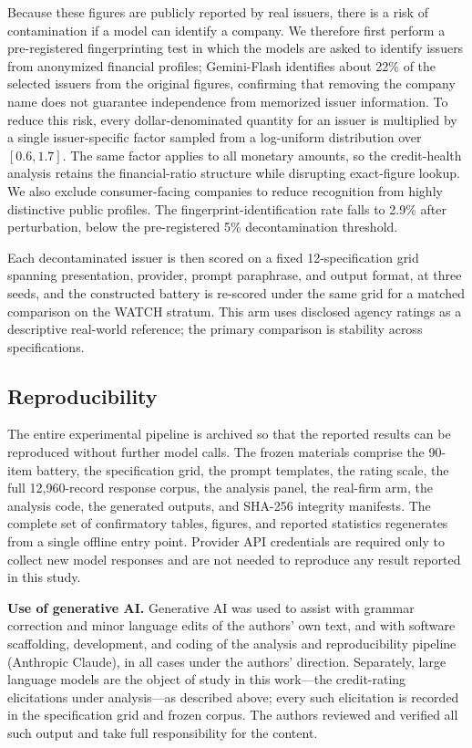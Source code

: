 \documentclass[pdflatex,sn-nature,lineno]{sn-jnl}
\theoremstyle{thmstyleone}
\begin{document}
Because these figures are publicly reported by real issuers, there is a risk of contamination if a model
can identify a company. We therefore first perform a pre-registered fingerprinting test in which the
models are asked to identify issuers from anonymized financial profiles; Gemini-Flash identifies about
22\% of the selected issuers from the original figures, confirming that removing the company name does not
guarantee independence from memorized issuer information. To reduce this risk, every dollar-denominated
quantity for an issuer is multiplied by a single issuer-specific factor sampled from a log-uniform
distribution over $[0.6,1.7]$. The same factor applies to all monetary amounts, so the credit-health
analysis retains the financial-ratio structure while disrupting exact-figure lookup. We also
exclude consumer-facing companies to reduce recognition from highly distinctive public profiles. The
fingerprint-identification rate falls to 2.9\% after perturbation, below the pre-registered 5\%
decontamination threshold.

Each decontaminated issuer is then scored on a fixed 12-specification grid spanning presentation,
provider, prompt paraphrase, and output format, at three seeds, and the constructed battery is re-scored
under the same grid for a matched comparison on the WATCH stratum. This arm uses disclosed agency ratings
as a descriptive real-world reference; the primary comparison is stability across specifications.

\subsection{Reproducibility}
The entire experimental pipeline is archived so that the reported results can be reproduced without
further model calls. The frozen materials comprise the 90-item battery, the specification grid, the
prompt templates, the rating scale, the full 12{,}960-record response corpus, the analysis panel, the
real-firm arm, the analysis code, the generated outputs, and SHA-256 integrity manifests. The complete
set of confirmatory tables, figures, and reported statistics regenerates from a single offline entry
point. Provider API credentials are required only to collect new model responses and are not needed to
reproduce any result reported in this study.

\textbf{Use of generative AI.} Generative AI was used to assist with grammar correction and minor
language edits of the authors' own text, and with software scaffolding, development, and coding of the
analysis and reproducibility pipeline (Anthropic Claude), in all cases under the authors' direction.
Separately, large language models are the object of study in this work---the credit-rating elicitations
under analysis---as described above; every such elicitation is recorded in the specification grid and
frozen corpus. The authors reviewed and verified all such output and take full responsibility for the
content.
\end{document}
